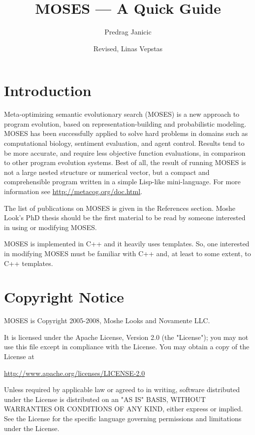 \documentclass{article}
\title{MOSES --- A Quick Guide}
\author{Predrag Janicic}
\author{Revised, Linas Vepstas}
\begin{document}
\maketitle

\tableofcontents

\newpage

\section{Introduction}

Meta-optimizing semantic evolutionary search (MOSES) is a new approach to
program evolution, based on representation-building and probabilistic
modeling. MOSES has been successfully applied to solve hard problems in domains
such as computational biology, sentiment evaluation, and agent control. Results
tend to be more accurate, and require less objective function evaluations, in
comparison to other program evolution systems. Best of all, the result of
running MOSES is not a large nested structure or numerical vector, but a
compact and comprehensible program written in a simple Lisp-like
mini-language. For more information see \url{http://metacog.org/doc.html}.

The list of publications on MOSES is given in the References section.
Moshe Look's PhD thesis \cite{6} should be the first material to be read
by someone interested in using or modifying MOSES.

MOSES is implemented in C++ and it heavily uses templates. So, one interested 
in modifying MOSES must be familiar with C++ and, at least to some extent, to 
C++ templates.


\section{Copyright Notice}

MOSES is Copyright 2005-2008, Moshe Looks and Novamente LLC.

It is licensed under the Apache License, Version 2.0 (the "License");
you may not use this file except in compliance with the License.
You may obtain a copy of the License at

\url{http://www.apache.org/licenses/LICENSE-2.0}

Unless required by applicable law or agreed to in writing, software
distributed under the License is distributed on an "AS IS" BASIS,
WITHOUT WARRANTIES OR CONDITIONS OF ANY KIND, either express or implied.
See the License for the specific language governing permissions and
limitations under the License.
\end{document}
